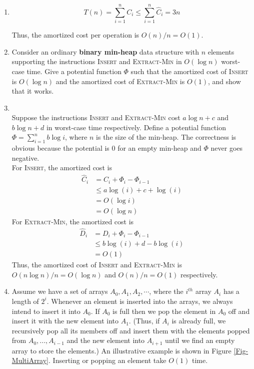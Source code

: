 \documentclass[12pt,a4paper]{article}
\makeatletter
\newtheorem*{solution}{Solution}
\theoremstyle{definition}
\renewenvironment{solution}[1][Solution] {\par\pushQED{\qed}\normalfont\topsep6\p@\@plus6\p@\relax\trivlist\item[\hskip\labelsep\bfseries#1\@addpunct{.}]\ignorespaces}{\popQED\endtrivlist\@endpefalse} \makeatother
\makeatother
\begin{document}
\begin{enumerate}
\begin{solution}
    \begin{equation*}
        T(n) = \sum_{i=1}^{n}C_i \le \sum_{i=1}^{n}\widehat{C}_i=3n
    \end{equation*}
    
    Thus, the amortized cost per operation is $O(n)/n=O(1)$.
	\end{solution}

	\item Consider an ordinary \textbf{binary min-heap} data structure with $n$ elements supporting
the instructions \textsc{Insert} and \textsc{Extract-Min} in $O(\log n)$ worst-case time. Give a
potential function $\Phi$ such that the amortized cost of \textsc{Insert} is $O(\log n)$ and the
amortized cost of \textsc{Extract-Min} is $O(1)$, and show that it works.

    \begin{solution}
    ~\\
    Suppose the instructions \textsc{Insert} and \textsc{Extract-Min} cost $a\log n + c$ and $b\log n +d $ in worst-case time respectively. Define a potential function $\Phi = \sum_{i=1}^n b\log i$, where $n$ is the  size of the min-heap. The correctness is obvious because the potential is 0 for an empty min-heap and $\Phi$ never goes negative.\\
    For \textsc{Insert}, the amortized cost is
    \begin{align*}
        \widehat{C}_i &= C_i + \Phi_i - \Phi_{i-1}\\
        &\le a\log(i)+c+\log(i)\\
        &= O(\log i)\\
        &= O(\log n)
    \end{align*}
    For \textsc{Extract-Min}, the amortized cost is
    \begin{align*}
        \widehat{D}_i &= D_i + \Phi_{i} - \Phi_{i-1}\\
        &\le b\log(i)+d-b\log(i)\\
        &= O(1)
    \end{align*}
    Thus, the amortized cost of \textsc{Insert} and \textsc{Extract-Min} is $O(n\log n)/n=O(\log n)$ and $O(n)/n = O(1)$ respectively. 
    \end{solution}
	
	\item Assume we have a set of arrays $A_0, A_1, A_2,\cdots$, where the $i^{th}$ array $A_i$ has a length of $2^i$. Whenever an element is inserted into the arrays, we always intend to insert it into $A_0$. If $A_0$ is full then we pop the element in $A_0$ off and insert it with the new element into $A_{1}$. (Thus, if $A_{i}$ is already full, we recursively pop all its members off and insert them with the elements popped from $A_0,...,A_{i-1}$ and the new element into $A_{i+1}$ until we find an empty array to store the elements.) An illustrative example is shown in Figure \ref{Fig-MultiArray}. Inserting or popping an element take $O(1)$ time.


\end{enumerate}
\end{document}
